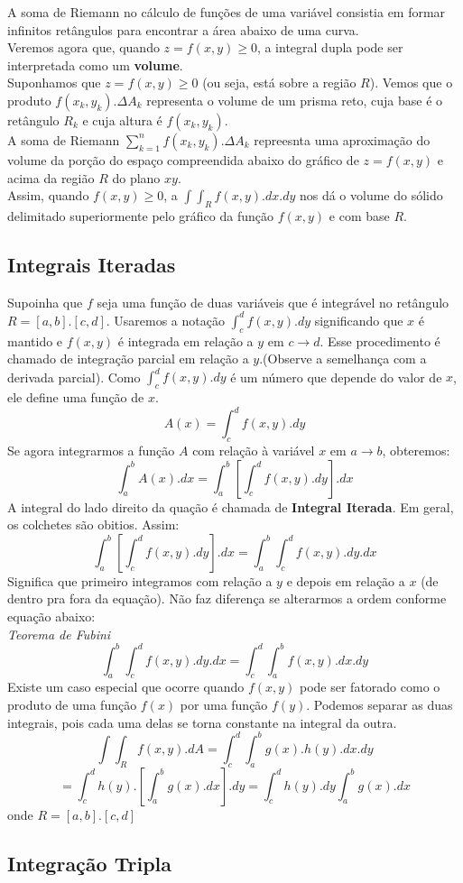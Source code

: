 \documentclass{article}
\begin{document}
			A soma de Riemann no cálculo de funções de uma variável consistia em formar infinitos retângulos para encontrar a área abaixo de uma curva.\\
			Veremos agora que, quando $z = f(x,y) \geq 0$, a integral dupla pode ser interpretada como um \textbf{volume}.\\
			Suponhamos que $z=f(x,y) \geq 0$ (ou seja, está sobre a região $R$). Vemos que o produto $f(x_k,y_k).\Delta A_k$ representa o volume de um prisma reto, cuja base é o retângulo $R_k$ e cuja altura é $f(x_k,y_k)$.\\
			A soma de Riemann $\sum_{k=1}^n f(x_k,y_k). \Delta A_k$ repreesnta uma aproximação do volume da porção do espaço compreendida abaixo do gráfico de $z=f(x,y)$ e acima da região $R$ do plano $xy$.\\
			Assim, quando $f(x,y) \geq 0$, a $\int \int_R f(x,y).dx.dy$ nos dá o volume do sólido delimitado superiormente pelo gráfico da função $f(x,y)$ e com base $R$.
		\subsection{Integrais Iteradas}
			Supoinha que $f$ seja uma função de duas variáveis que é integrável no retângulo $R = [a,b].[c,d]$. Usaremos a notação $\int_c^d f(x,y).dy$ significando que $x$ é mantido e $f(x,y)$ é integrada em relação a $y$ em $c \to d$. Esse procedimento é chamado de integração parcial em relação a $y$.(Observe a semelhança com a derivada parcial). Como $\int_c^d f(x,y).dy$ é um número que depende do valor de $x$, ele define uma função de $x$.
			$$A(x) = \int _c^d f(x,y).dy$$
			Se agora integrarmos a função $A$ com relação à variável $x$ em $a \to b$, obteremos:
			$$\int_a^b A(x).dx = \int_a^b [\int_c^d f(x,y).dy].dx$$
			A integral do lado direito da quação é chamada de \textbf{Integral Iterada}. Em geral, os colchetes são obitios. Assim:
			$$\int_a^b [\int_c^d f(x,y).dy].dx=\int_a^b \int_c^d f(x,y).dy.dx$$
			Significa que primeiro integramos com relação a $y$ e depois em relação a $x$ (de dentro pra fora da equação). Não faz diferença se alterarmos a ordem conforme equação abaixo:
			\\\textit{Teorema de Fubini}
			$$\int_a^b \int_c^d f(x,y).dy.dx = \int_c^d \int_a^b f(x,y).dx.dy$$
			Existe um caso especial que ocorre quando $f(x,y)$ pode ser fatorado como o produto de uma função $f(x)$ por uma função $f(y)$. Podemos separar as duas integrais, pois cada uma delas se torna constante na integral da outra.
			$$\int \int_R f(x,y).dA = \int_c^d\int_a^b g(x).h(y).dx.dy$$
			$$= \int_c^dh(y).[\int_a^bg(x).dx].dy = \int_c^dh(y).dy \int_a^bg(x).dx$$
			onde $R = [a,b].[c,d]$
		\subsection{Integração Tripla}
 
\end{document}
